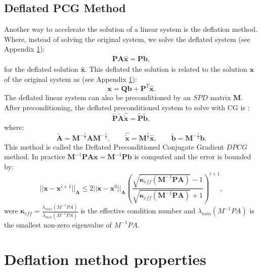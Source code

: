 \documentclass[12pt]{article}
\begin{document}
{\subsection{Deflated PCG Method}
\hspace{0.5cm}Another way to accelerate the solution of a linear system is the deflation method.
Where, instead of solving the original system, we  solve the deflated system (see Appendix \ref{a4}):
\begin{align}\label{eq:defsol}
\mathbf{P}\mathbf{A} \hat{\mathbf{x}}=\mathbf{P}\mathbf{b},
\end{align}
for the deflated solution $\hat{\mathbf{x}}$. 
This deflated the solution is related to the solution $\mathbf{x}$ of the original system as (see Appendix \ref{a4}):
\begin{equation}\label{eq:xfromxh}
    \mathbf{x}=\mathbf{Q}\mathbf{b}+\mathbf{P}^T\mathbf{\hat{x}}.
\end{equation}
The deflated linear system can also be preconditioned by an $SPD$ matrix $\mathbf{M}$. After preconditioning, the deflated preconditioned system to solve with CG is \cite{Tang09}:
$$\tilde{\mathbf{P}} \tilde{\mathbf{A}} \hat{\tilde{\mathbf{x}}}=\tilde{\mathbf{P}}\tilde{\mathbf{b}},$$
where:
\begin{equation*}
 \tilde{\mathbf{A}}=\mathbf{M}^{-\frac{1}{2}}\mathbf{A}\mathbf{M}^{-\frac{1}{2}}, \qquad \hat{\tilde{\mathbf{x}}}=\mathbf{M}^{\frac{1}{2}}\hat{\mathbf{x}}, \qquad
 \tilde{\mathbf{b}}=\mathbf{M}^{-\frac{1}{2}}\mathbf{b}.
\end{equation*}
This method is called the Deflated Preconditioned Conjugate Gradient $DPCG$ method.
In practice $\mathbf{M}^{-1}\mathbf{P}\mathbf{A}\mathbf{x}=\mathbf{M}^{-1}\mathbf{P}\mathbf{b}$ is computed and the error is bounded by:
\begin{equation*}
 ||\mathbf{x}-\mathbf{x}^{i+1}||_\mathbf{A}\leq 2||\mathbf{x}-\mathbf{x}^{0}||_\mathbf{A} \left( \frac{\sqrt{\mathbf{\kappa}_{eff}(\mathbf{M}^{-1}\mathbf{P}\mathbf{A})}-1}{\sqrt{\mathbf{\kappa}_{eff}(\mathbf{M}^{-1}\mathbf{P}\mathbf{A})}+1} \right)^{i+1},
\end{equation*}
were $\mathbf{\kappa}_{eff}=\frac{\lambda_{max}(M^{-1}PA)}{\lambda_{min}(M^{-1}PA)}$ is the effective condition 
number and $\lambda_{min}(M^{-1}PA)$ is the smallest non-zero eigenvalue of $M^{-1}PA$.\par


\newpage
\section{Deflation method properties}\label{a4}

}
\end{document}
